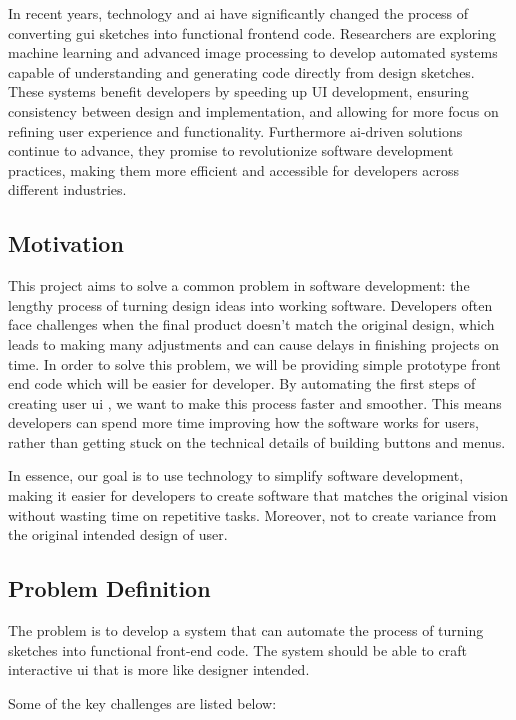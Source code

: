 \documentclass{ioereport}
\begin{document}
In recent years, technology and \gls{ai} have significantly changed the
process of converting \gls{gui} sketches into functional frontend
code. Researchers are exploring machine learning and advanced image processing to
develop automated systems capable of understanding and generating code directly from
design sketches. These systems benefit developers by speeding up UI development,
ensuring consistency between design and implementation, and allowing for more focus
on refining user experience and functionality. Furthermore \gls{ai}-driven solutions
continue to advance, they promise to revolutionize software development practices,
making them more efficient and accessible for developers across different industries.
    \subsection{Motivation}
This project aims to solve a common problem in software development: the lengthy
process of turning design ideas into working software. Developers often face challenges
when the final product doesn't match the original design, which leads to making many
adjustments and can cause delays in finishing projects on time. In order to solve this
problem, we will be providing simple prototype front end code which will be easier for
developer. By automating the first steps of creating user \gls{ui} , we want to
make this process faster and smoother. This means developers can spend more time improving how the software works for users, rather than getting stuck on the technical
details of building buttons and menus.

In essence, our goal is to use technology to simplify software development, making it
easier for developers to create software that matches the original vision without wasting
time on repetitive tasks. Moreover, not to create variance from the original intended
design of user.
    \subsection{Problem Definition}
The problem is to develop a system that can automate the process of turning sketches
into functional front-end code. The system should be able to craft interactive \gls{ui} that is more like designer intended.

Some of the key challenges are listed below:
\end{document}
